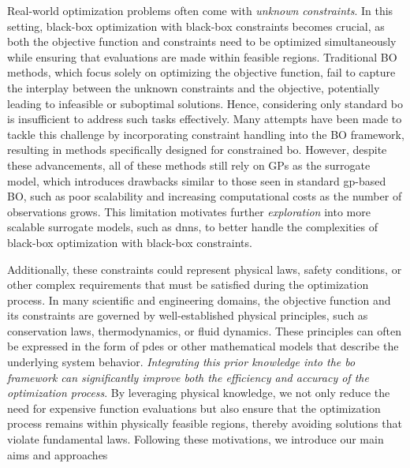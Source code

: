 Real-world optimization problems often come with \textit{unknown constraints}. In this setting, black-box optimization with black-box constraints becomes crucial, as both the objective function and constraints need to be optimized simultaneously while ensuring that evaluations are made within feasible regions. Traditional BO methods, which focus solely on optimizing the objective function, fail to capture the interplay between the unknown constraints and the objective, potentially leading to infeasible or suboptimal solutions. Hence, considering only standard \ac{bo} is insufficient to address such tasks effectively. Many attempts have been made to tackle this challenge by incorporating constraint handling into the BO framework, resulting in methods specifically designed for constrained \ac{bo}\citep{gelbart2014bayesian, ariafar2019admmbo, nguyen2023optimistic}. However, despite these advancements, all of these methods still rely on GPs as the surrogate model, which introduces drawbacks similar to those seen in standard \ac{gp}-based BO, such as poor scalability and increasing computational costs as the number of observations grows. This limitation motivates further \textit{exploration} into more scalable surrogate models, such as \acp{dnn}, to better handle the complexities of black-box optimization with black-box constraints.

Additionally, these constraints could represent physical laws, safety conditions, or other complex requirements that must be satisfied during the optimization process. In many scientific and engineering domains, the objective function and its constraints are governed by well-established physical principles, such as conservation laws, thermodynamics, or fluid dynamics. These principles can often be expressed in the form of \acp{pde} or other mathematical models that describe the underlying system behavior. \textit{Integrating this prior knowledge into the \ac{bo} framework can significantly improve both the efficiency and accuracy of the optimization process}. By leveraging physical knowledge, we not only reduce the need for expensive function evaluations but also ensure that the optimization process remains within physically feasible regions, thereby avoiding solutions that violate fundamental laws. 
Following these motivations, we introduce our main aims and approaches 


